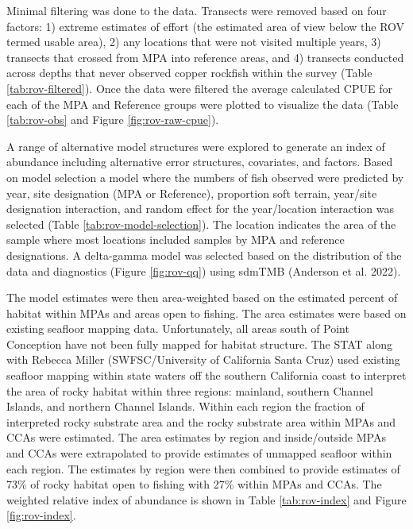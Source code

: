 \documentclass[11pt,
  english,
  letterpaper,
]{article}
\begin{document}
Minimal filtering was done to the data. Transects were removed based on four factors: 1) extreme estimates of effort (the estimated area of view below the ROV termed usable area), 2) any locations that were not visited multiple years, 3) transects that crossed from MPA into reference areas, and 4) transects conducted across depths that never observed copper rockfish within the survey (Table \ref{tab:rov-filtered}). Once the data were filtered the average calculated CPUE for each of the MPA and Reference groups were plotted to visualize the data (Table \ref{tab:rov-obs} and Figure \ref{fig:rov-raw-cpue}).

A range of alternative model structures were explored to generate an index of abundance including alternative error structures, covariates, and factors. Based on model selection a model where the numbers of fish observed were predicted by year, site designation (MPA or Reference), proportion soft terrain, year/site designation interaction, and random effect for the year/location interaction was selected (Table \ref{tab:rov-model-selection}). The location indicates the area of the sample where most locations included samples by MPA and reference designations. A delta-gamma model was selected based on the distribution of the data and diagnostics (Figure \ref{fig:rov-qq}) using sdmTMB (Anderson et al. 2022).

The model estimates were then area-weighted based on the estimated percent of habitat within MPAs and areas open to fishing. The area estimates were based on existing seafloor mapping data. Unfortunately, all areas south of Point Conception have not been fully mapped for habitat structure. The STAT along with Rebecca Miller (SWFSC/University of California Santa Cruz) used existing seafloor mapping within state waters off the southern California coast to interpret the area of rocky habitat within three regions: mainland, southern Channel Islands, and northern Channel Islands. Within each region the fraction of interpreted rocky substrate area and the rocky substrate area within MPAs and CCAs were estimated. The area estimates by region and inside/outside MPAs and CCAs were extrapolated to provide estimates of unmapped seafloor within each region. The estimates by region were then combined to provide estimates of 73\% of rocky habitat open to fishing with 27\% within MPAs and CCAs. The weighted relative index of abundance is shown in Table \ref{tab:rov-index} and Figure \ref{fig:rov-index}.

\newpage
\end{document}

